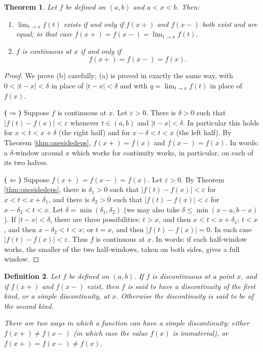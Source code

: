 \documentclass{article}
\theoremstyle{mythm}
\newtheorem{theorem}{Theorem}[section]
\newtheorem{definition}[theorem]{Definition}
\begin{document}
\begin{theorem}\label{thm:contonesided}
Let $f$ be defined on $(a,b)$ and $a < x < b$. Then:
\begin{enumerate}[label=(\alph*)]
    \item $\lim_{t \to x} f(t)$ exists if and only if $f(x+)$ and $f(x-)$ both exist and are equal; in that case $f(x+) = f(x-) = \lim_{t \to x} f(t)$.
    \item $f$ is continuous at $x$ if and only if
    \[
    f(x+) = f(x-) = f(x).
    \]
\end{enumerate}
\end{theorem}

\begin{proof}
We prove (b) carefully; (a) is proved in exactly the same way, with $0 < |t - x| < \delta$ in place of $|t - x| < \delta$ and with $q = \lim_{t\to x} f(t)$ in place of $f(x)$.

\textbf{($\Rightarrow$)} Suppose $f$ is continuous at $x$. Let $\varepsilon > 0$. There is $\delta > 0$ such that $|f(t) - f(x)| < \varepsilon$ whenever $t \in (a,b)$ and $|t - x| < \delta$. In particular this holds for $x < t < x + \delta$ (the right half) and for $x - \delta < t < x$ (the left half). By Theorem \ref{thm:onesidedeps}, $f(x+) = f(x)$ and $f(x-) = f(x)$. In words: a $\delta$-window around $x$ which works for continuity works, in particular, on each of its two halves.

\textbf{($\Leftarrow$)} Suppose $f(x+) = f(x-) = f(x)$. Let $\varepsilon > 0$. By Theorem \ref{thm:onesidedeps}, there is $\delta_1 > 0$ such that $|f(t) - f(x)| < \varepsilon$ for $x < t < x + \delta_1$, and there is $\delta_2 > 0$ such that $|f(t) - f(x)| < \varepsilon$ for $x - \delta_2 < t < x$. Let $\delta = \min(\delta_1, \delta_2)$ (we may also take $\delta \leq \min(x - a, b - x)$). If $|t - x| < \delta$, there are three possibilities: $t > x$, and then $x < t < x + \delta_1$; $t < x$, and then $x - \delta_2 < t < x$; or $t = x$, and then $|f(t) - f(x)| = 0$. In each case $|f(t) - f(x)| < \varepsilon$. Thus $f$ is continuous at $x$. In words: if each half-window works, the smaller of the two half-windows, taken on both sides, gives a full window.
\end{proof}

\begin{definition}\label{def:kinds}
Let $f$ be defined on $(a,b)$. If $f$ is discontinuous at a point $x$, and if $f(x+)$ and $f(x-)$ exist, then $f$ is said to have a \textit{discontinuity of the first kind}, or a \textit{simple discontinuity}, at $x$. Otherwise the discontinuity is said to be of the \textit{second kind}.

There are two ways in which a function can have a simple discontinuity: either $f(x+) \neq f(x-)$ (in which case the value $f(x)$ is immaterial), or $f(x+) = f(x-) \neq f(x)$.
\end{definition}
\end{document}
